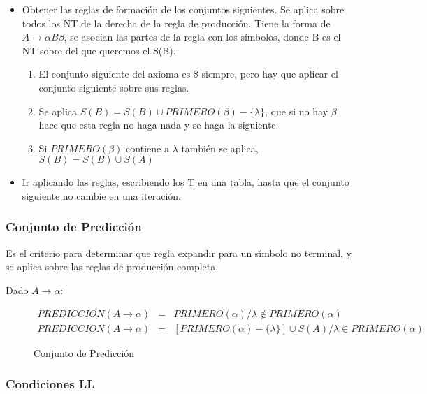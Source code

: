 \documentclass[12pt, twoside, openright]{report} %
\begin{document}
\begin{itemize}
	\item Obtener las reglas de formación de los conjuntos siguientes. Se aplica
	      sobre todos los NT de la derecha de la regla de producción. Tiene la
	      forma de \(A \rightarrow \alpha B \beta\), se asocian las partes de la
	      regla con los símbolos, donde B es el NT sobre del que queremos el
	      S(B).

	      \begin{enumerate}
		      \def\labelenumi{\arabic{enumi}.}
		      \item El conjunto siguiente del axioma es \$ siempre, pero hay que aplicar
		            el conjunto siguiente sobre sus reglas.
		      \item Se aplica \(S(B)=S(B)\cup PRIMERO(\beta)-\{\lambda\}\), que si no hay
		            \(\beta\) hace que esta regla no haga nada y se haga la siguiente.
		      \item Si \(PRIMERO(\beta)\) contiene a \(\lambda\) también se aplica,
		            \(S(B)=S(B)\cup S(A)\)
	      \end{enumerate}
	\item Ir aplicando las reglas, escribiendo los T en una tabla, hasta que el
	      conjunto siguiente no cambie en una iteración.
\end{itemize}

\subsubsection{Conjunto de Predicción}

Es el criterio para determinar que regla expandir para un símbolo no
terminal, y se aplica sobre las reglas de producción completa.

Dado \(A \rightarrow \alpha\):

\begin{figure}[H]
	\begin{eqnarray*}
		PREDICCION(A \rightarrow \alpha) &=& PRIMERO(\alpha) / \lambda \notin PRIMERO(\alpha) \\
		PREDICCION(A \rightarrow \alpha) &=& [PRIMERO(\alpha)-\{\lambda\}] \cup S(A) / \lambda \in PRIMERO(\alpha)
	\end{eqnarray*}

	\captionsetup{justification=centering}
	\caption{Conjunto de Predicción}
\end{figure}

\pagebreak
\subsubsection{Condiciones LL}
\end{document}
